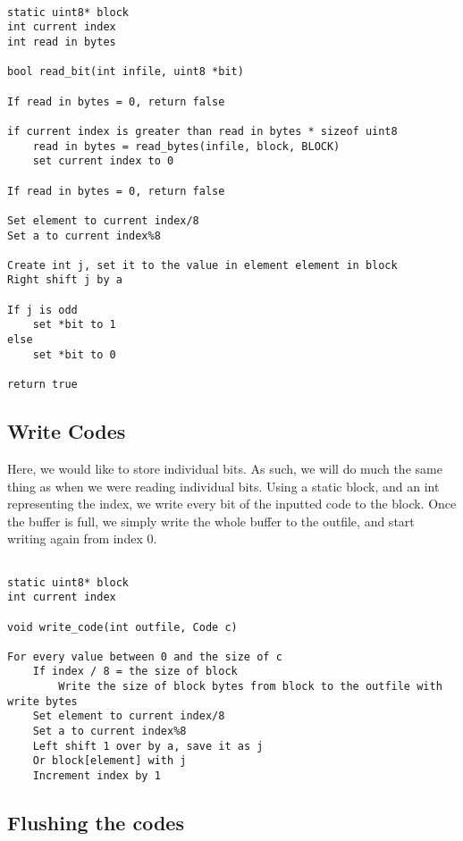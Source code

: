 \documentclass[11pt]{article}
\begin{document}
\begin{verbatim}

static uint8* block
int current index
int read in bytes

bool read_bit(int infile, uint8 *bit)

If read in bytes = 0, return false

if current index is greater than read in bytes * sizeof uint8
    read in bytes = read_bytes(infile, block, BLOCK)
    set current index to 0

If read in bytes = 0, return false

Set element to current index/8
Set a to current index%8

Create int j, set it to the value in element element in block
Right shift j by a

If j is odd
    set *bit to 1
else
    set *bit to 0

return true

\end{verbatim}

\subsection{Write Codes}

Here, we would like to store individual bits. As such, we will do much the same thing as when we were reading individual bits. Using a static block, and an int representing the index, we write every bit of the inputted code to the block. Once the buffer is full, we simply write the whole buffer to the outfile, and start writing again from index 0.

\begin{verbatim}

static uint8* block
int current index

void write_code(int outfile, Code c)

For every value between 0 and the size of c
    If index / 8 = the size of block
        Write the size of block bytes from block to the outfile with write bytes
    Set element to current index/8
    Set a to current index%8
    Left shift 1 over by a, save it as j
    Or block[element] with j
    Increment index by 1

\end{verbatim}

\subsection{Flushing the codes}
\end{document}
